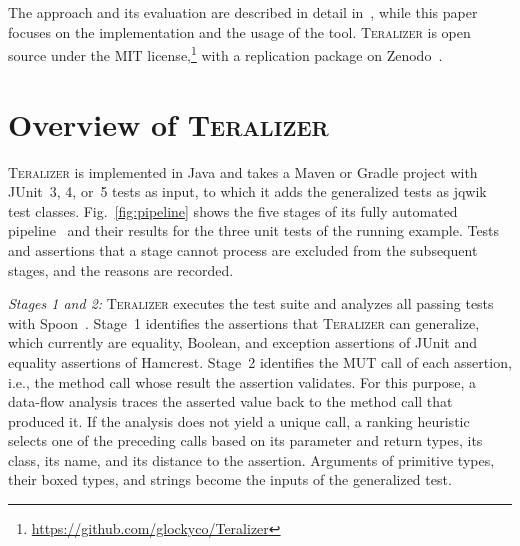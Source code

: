 \documentclass[10pt,conference]{IEEEtran}
\newcommand{\Teralizer}{\textsc{Teralizer}}
\newcommand{\runin}[1]{\textit{#1:}}
\begin{document}
The approach and its evaluation are described in detail in~\cite{glock_2025_teralizer}, while this paper focuses on the implementation and the usage of the tool.
\Teralizer{} is open source under the MIT license,\footnote{\url{https://github.com/glockyco/Teralizer}} with a replication package on Zenodo~\cite{glock_2026_replication}.

\section{Overview of \Teralizer{}}
\label{sec:approach}

\Teralizer{} is implemented in Java and takes a Maven or Gradle project with JUnit~3, 4, or~5 tests as input, to which it adds the generalized tests as jqwik test classes.
Fig.~\ref{fig:pipeline} shows the five stages of its fully automated pipeline~\cite{glock_2025_teralizer} and their results for the three unit tests of the running example.
Tests and assertions that a stage cannot process are excluded from the subsequent stages, and the reasons are recorded.

\runin{Stages 1 and 2}
\Teralizer{} executes the test suite and analyzes all passing tests with Spoon~\cite{pawlak_2016_spoon}.
Stage~1 identifies the assertions that \Teralizer{} can generalize, which currently are equality, Boolean, and exception assertions of JUnit and equality assertions of Hamcrest.
Stage~2 identifies the MUT call of each assertion, i.e., the method call whose result the assertion validates.
For this purpose, a data-flow analysis traces the asserted value back to the method call that produced it.
If the analysis does not yield a unique call, a ranking heuristic selects one of the preceding calls based on its parameter and return types, its class, its name, and its distance to the assertion.
Arguments of primitive types, their boxed types, and strings become the inputs of the generalized test.
\end{document}
